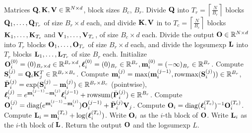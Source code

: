 \documentclass{article} %
\begin{document}
\begin{algorithm}[h!]
  \caption{Flash Attention: Forward Pass}\label{alg:fa_forward}
  \begin{algorithmic}[1]
    \REQUIRE Matrices ${\mathbf{Q}}, {\mathbf{K}}, {\mathbf{V}} \in \mathbb{R}^{N \times d}$, block sizes $B_c$, $B_r$.
    \STATE \label{alg:stream_attn_split_qkv} Divide ${\mathbf{Q}}$ into $T_r = \left\lceil\frac{N}{B_r} \right\rceil$ blocks ${\mathbf{Q}}_1, \dots, {\mathbf{Q}}_{T_r}$ of size $B_r \times d$ each,
    and divide ${\mathbf{K}}, {\mathbf{V}}$ in to $T_c = \left\lceil \frac{N}{B_c} \right\rceil$ blocks ${\mathbf{K}}_1, \dots, {\mathbf{K}}_{T_c}$ and
    ${\mathbf{V}}_1, \dots, {\mathbf{V}}_{T_c}$, of size $B_c \times d$ each.
    \STATE Divide the output ${\mathbf{O}} \in \mathbb{R}^{N \times d}$ into $T_r$ blocks ${\mathbf{O}}_1, \dots, {\mathbf{O}}_{T_r}$ of size
    $B_r \times d$ each, and divide the logsumexp ${\mathbf{L}}$ into $T_r$ blocks ${\mathbf{L}}_1, \dots, {\mathbf{L}}_{T_r}$ of size
    $B_r$ each.
     \label{alg:stream_attn_outer_loop}
      \STATE Initialize ${\mathbf{O}}_{i}^{(0)} = (0)_{B_r \times d} \in \mathbb{R}^{B_r \times d}, {\boldsymbol{\ell}}_{i}^{(0)} = (0)_{B_r} \in \mathbb{R}^{B_r}, {\mathbf{m}}_{i}^{(0)} = (-\infty)_{B_r} \in \mathbb{R}^{B_r}$.
        \STATE Compute ${\mathbf{S}}_{i}^{(j)} = {\mathbf{Q}}_i {\mathbf{K}}_j^T \in \mathbb{R}^{B_r \times B_c}$.
        \STATE Compute
        ${\mathbf{m}}_{i}^{(j)} = \mathrm{max}({\mathbf{m}}_{i}^{(j-1)}, \mathrm{rowmax}({\mathbf{S}}_{i}^{(j)})) \in \mathbb{R}^{B_r}$, $\bar{{\mathbf{P}}}_{i}^{(j)} = \exp({\mathbf{S}}_{i}^{(j)} - {\mathbf{m}}_{i}^{(j)}) \in \mathbb{R}^{B_r \times B_c}$ (pointwise),
        ${\boldsymbol{\ell}}_{i}^{(j)} = e^{{\mathbf{m}}_{i}^{(j-1)} - {\mathbf{m}}_{i}^{(j)}} {\boldsymbol{\ell}}_{i}^{(j-1)} + \mathrm{row sum}(\bar{{\mathbf{P}}}_{i}^{(j)}) \in \mathbb{R}^{B_r}$.
        \STATE Compute
        ${\mathbf{O}}_{i}^{(j)} = \text{diag}(e^{{\mathbf{m}}_{i}^{(j-1)} - {\mathbf{m}}_{i}^{(j)}}) {\mathbf{O}}_{i}^{(j-1)} + \bar{{\mathbf{P}}}_{i}^{(j)} {\mathbf{V}}_j$.
      \ENDFOR
      \STATE Compute ${\mathbf{O}}_{i} = \text{diag}({\boldsymbol{\ell}}_{i}^{(T_c)})^{-1} {\mathbf{O}}_{i}^{(T_c)}$.
      \STATE Compute ${\mathbf{L}}_{i} = {\mathbf{m}}_{i}^{(T_c)} + \log({\boldsymbol{\ell}}_{i}^{(T_c)})$.
      \STATE Write ${\mathbf{O}}_{i}$ as the $i$-th block of ${\mathbf{O}}$.
      \STATE Write ${\mathbf{L}}_{i}$ as the $i$-th block of ${\mathbf{L}}$.
    \ENDFOR
    \STATE Return the output ${\mathbf{O}}$ and the logsumexp $L$.
  \end{algorithmic}
\end{algorithm}
\end{document}

